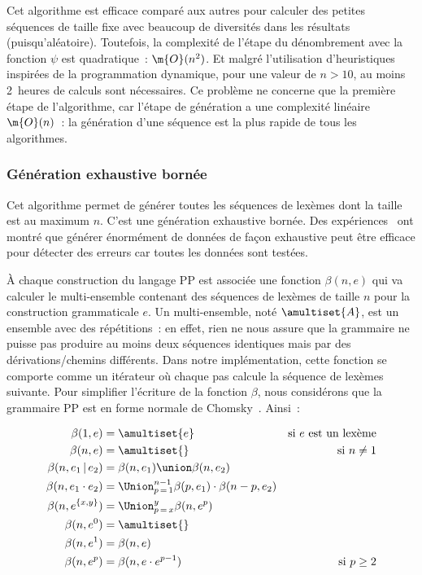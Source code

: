 Cet algorithme est efficace comparé aux autres pour calculer des petites
séquences de taille fixe avec beaucoup de diversités dans les résultats
(puisqu'aléatoire). Toutefois, la complexité de l'étape du dénombrement avec la
fonction $\psi$ est quadratique~: $\m{O}(n^2)$. Et malgré l'utilisation
d'heuristiques inspirées de la programmation dynamique, pour une valeur de $n >
10$, au moins 2~heures de calculs sont nécessaires. Ce problème ne concerne que
la première étape de l'algorithme, car l'étape de génération a une complexité
linéaire $\m{O}(n)$~: la génération d'une séquence est la plus rapide de tous
les algorithmes.

\subsubsection{Génération exhaustive bornée}
\label{subsection:data:bounded_exhaustive_generation}

Cet algorithme permet de générer toutes les séquences de lexèmes dont la taille
est au maximum $n$. C'est une génération exhaustive bornée. Des
expériences~ ont montré que générer énormément
de données de façon exhaustive peut être efficace pour détecter des erreurs car
toutes les données sont testées.

À chaque construction du langage PP est associée une fonction $\beta(n, e)$ qui
va calculer le multi-ensemble contenant des séquences de lexèmes de taille $n$
pour la construction grammaticale $e$. Un multi-ensemble, noté $\amultiset{A}$,
est un ensemble avec des répétitions~: en effet, rien ne nous assure que la
grammaire ne puisse pas produire au moins deux séquences identiques mais par des
dérivations/chemins différents. Dans notre implémentation, cette fonction se
comporte comme un itérateur où chaque pas calcule la séquence de lexèmes
suivante. Pour simplifier l'écriture de la fonction $\beta$, nous considérons
que la grammaire PP est en forme normale de Chomsky~. Ainsi~:

\begin{align*}
%
\beta(1, e) & =
    \amultiset{e}
    &
    \text{si $e$ est un lexème}
    \\
%
\beta(n, e) & =
    \amultiset{}
    &
    \text{si $n \neq 1$}
    \\
%
\beta(n, e_1 \,\vert\, e_2) & =
    \beta(n, e_1) \union \beta(n, e_2)
    \\
%
\beta(n, e_1 \cdot e_2) & =
    \Union_{p \,=\, 1}^{n - 1}
    \beta(p, e_1) \cdot \beta(n - p, e_2)
    \\
%
\beta(n, e^{\{x, y\}}) & =
    \Union_{p \,=\, x}^y \beta(n, e^p)
    \\
%
%
\beta(n, e^0) & =
    \amultiset{}
    \\
%
\beta(n, e^1) & =
    \beta(n, e)
    \\
%
\beta(n, e^p) & =
    \beta(n, e \cdot e^{p - 1})
    &
    \text{si $p \geq 2$}
%
\end{align*}

